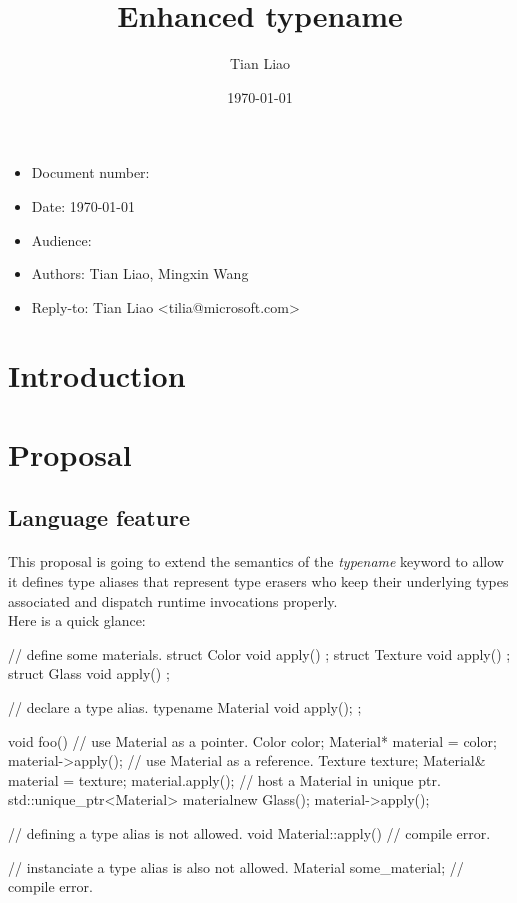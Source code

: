 \documentclass{article}
\title{Enhanced typename}
\author{Tian Liao}
\date{\today}
\begin{document}
\maketitle
\vfill
\begin{itemize}[noitemsep]
  \item[] Document number:
  \item[] Date: \today
  \item[] Audience:
  \item[] Authors: Tian Liao, Mingxin Wang
  \item[] Reply-to: Tian Liao \textless tilia@microsoft.com\textgreater
\end{itemize}

\newpage
{}

\section{Introduction}

\section{Proposal}

\subsection{Language feature}
\paragraph{}
This proposal is going to extend the semantics of the \textit{typename} keyword to allow it defines
type aliases that represent type erasers who keep their underlying types associated and dispatch
runtime invocations properly.\\
Here is a quick glance:
\begin{codeblock}
// define some materials.
struct Color { void apply() {} };
struct Texture { void apply() {} };
struct Glass { void apply() {} };

// declare a type alias.
typename Material { void apply(); };

void foo() {
  {
    // use Material as a pointer.
    Color color;
    Material* material = color;
    material->apply();
  }
  {
    // use Material as a reference.
    Texture texture;
    Material& material = texture;
    material.apply();
  }
  {
    // host a Material in unique ptr.
    std::unique_ptr<Material> material{new Glass()};
    material->apply();
  }
}

// defining a type alias is not allowed.
void Material::apply() {} // compile error.

// instanciate a type alias is also not allowed.
Material some_material; // compile error.

\end{codeblock}
\end{document}
